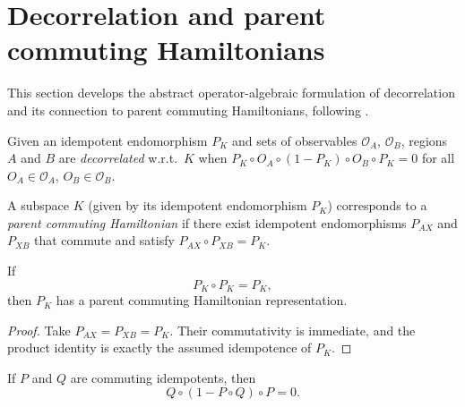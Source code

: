 \section{Decorrelation and parent commuting Hamiltonians}%
\label{sec:decorrelation}

This section develops the abstract operator-algebraic formulation of
decorrelation and its connection to parent commuting Hamiltonians, following
\cite[Appendix~D, Section~D.2]{Cirac2016MPDO_arXiv}.

\begin{definition}[Decorrelation]\label{def:is_decorrelated}
    \leanok
    Given an idempotent endomorphism $P_K$ and sets of observables
    $\mathcal{O}_A$, $\mathcal{O}_B$, regions $A$ and $B$ are
    \emph{decorrelated} w.r.t.\ $K$ when
    $P_K \circ O_A \circ (1 - P_K) \circ O_B \circ P_K = 0$
    for all $O_A \in \mathcal{O}_A$, $O_B \in \mathcal{O}_B$.
\end{definition}

\begin{definition}\label{def:has_commuting_parent_ham}
    \leanok
    A subspace $K$ (given by its idempotent endomorphism $P_K$) corresponds to
    a \emph{parent commuting Hamiltonian} if there exist idempotent endomorphisms
    $P_{AX}$ and $P_{XB}$ that commute and satisfy
    $P_{AX} \circ P_{XB} = P_K$.
\end{definition}

\begin{theorem}%
    \label{thm:has_commuting_parent_ham_of_idem}
    \leanok
    If
    \[
        P_K \circ P_K = P_K,
    \]
    then $P_K$ has a parent commuting Hamiltonian representation.
\end{theorem}

\begin{proof}
    \leanok
    Take $P_{AX} = P_{XB} = P_K$. Their commutativity is immediate, and the
    product identity is exactly the assumed idempotence of $P_K$.
\end{proof}

\begin{lemma}
    \label{lem:comp_complement_comm_zero}
    \leanok
    If $P$ and $Q$ are commuting idempotents, then
    \[
        Q \circ (1 - P \circ Q) \circ P = 0.
    \]
\end{lemma}

